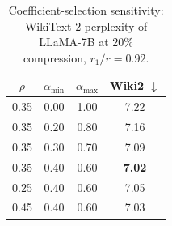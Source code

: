 \begin{table}[t]
\centering
\footnotesize
\renewcommand{\arraystretch}{1.1}
\setlength{\tabcolsep}{7pt}
\caption{Coefficient-selection sensitivity: WikiText-2 perplexity of LLaMA-7B at $20\%$ compression, $r_1/r=0.92$.}
\label{tab:beta-sensitivity}
\begin{tabular}{cccc}
\toprule
$\rho$ & $\alpha_{\min}$ & $\alpha_{\max}$ & Wiki2 $\downarrow$ \\
\midrule
0.35 & 0.00 & 1.00 & 7.22 \\
0.35 & 0.20 & 0.80 & 7.16 \\
0.35 & 0.30 & 0.70 & 7.09 \\
0.35 & 0.40 & 0.60 & \textbf{7.02} \\
\midrule
0.25 & 0.40 & 0.60 & 7.05 \\
0.45 & 0.40 & 0.60 & 7.03 \\
\bottomrule
\end{tabular}
\end{table}
